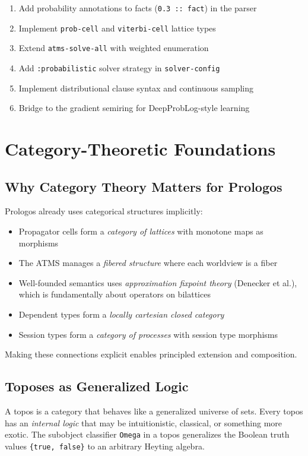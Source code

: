 \documentclass[11pt]{article}
\begin{document}
\begin{enumerate}
\item Add probability annotations to facts (\texttt{0.3 :: fact}) in the parser
\item Implement \texttt{prob-cell} and \texttt{viterbi-cell} lattice types
\item Extend \texttt{atms-solve-all} with weighted enumeration
\item Add \texttt{:probabilistic} solver strategy in \texttt{solver-config}
\item Implement distributional clause syntax and continuous sampling
\item Bridge to the gradient semiring for DeepProbLog-style learning
\end{enumerate}
\section{Category-Theoretic Foundations}
\label{sec:org3764850}

\subsection{Why Category Theory Matters for Prologos}
\label{sec:orga42d8b6}

Prologos already uses categorical structures implicitly:

\begin{itemize}
\item Propagator cells form a \emph{category of lattices} with monotone maps as morphisms
\item The ATMS manages a \emph{fibered structure} where each worldview is a fiber
\item Well-founded semantics uses \emph{approximation fixpoint theory} (Denecker et al.),
which is fundamentally about operators on bilattices
\item Dependent types form a \emph{locally cartesian closed category}
\item Session types form a \emph{category of processes} with session type morphisms
\end{itemize}

Making these connections explicit enables principled extension and composition.
\subsection{Toposes as Generalized Logic}
\label{sec:org597b17b}

A topos is a category that behaves like a generalized universe of sets. Every
topos has an \emph{internal logic} that may be intuitionistic, classical, or
something more exotic. The subobject classifier \texttt{Omega} in a topos generalizes
the Boolean truth values \texttt{\{true, false\}} to an arbitrary Heyting algebra.
\end{document}
